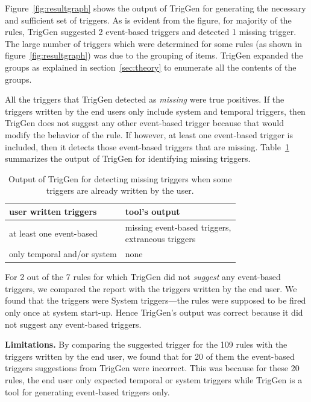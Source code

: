 \documentclass{sig-alternate-05-2015}
\begin{document}
Figure~\ref{fig:resultgraph} shows the output of TrigGen for generating the necessary and sufficient set of triggers. As is evident from the figure, for majority of the rules, TrigGen suggested 2 event-based triggers and detected 1 missing trigger. The large number of triggers which were determined for some rules (as shown in figure~\ref{fig:resultgraph}) was due to the grouping of items. TrigGen expanded the groups as explained in section~\ref{sec:theory} to enumerate all the contents of the groups. 

All the triggers that TrigGen detected as \textit{missing} were true positives. If the triggers written by the end users only include system and temporal triggers, then TrigGen does not suggest any other event-based trigger because that would modify the behavior of the rule. If however, at least one event-based trigger is included, then it detects those event-based triggers that are missing. 
Table~\ref{tab:scope2} summarizes the output of TrigGen for identifying missing triggers. 
\begin{table}[ht]
\centering
\begin{tabular}{|l|p{4cm}|}
\hline
user written triggers & tool's output \\ \hline
at least one event-based & \parbox[t]{5cm}{missing event-based triggers, \\extraneous triggers}  \\ \hline
only temporal and/or system & none \\\hline
\end{tabular}
\caption{Output of TrigGen for detecting missing triggers when some triggers are already written by the user.}
\label{tab:scope2}
\end{table}

For 2 out of the 7 rules for which TrigGen did not \textit{suggest} any event-based triggers, we compared the report with the triggers written by the end user. We found that the triggers were System triggers---the rules were supposed to be fired only once at system start-up. Hence TrigGen's output was correct because it did not suggest any event-based triggers. 

\textbf{Limitations.}
By comparing the suggested trigger for the 109 rules with the triggers written by the end user, we found that for 20 of them the  event-based triggers suggestions from TrigGen were incorrect. This was because for these 20 rules, the end user only expected temporal or system triggers while TrigGen is a tool for generating event-based triggers only.
\end{document}
